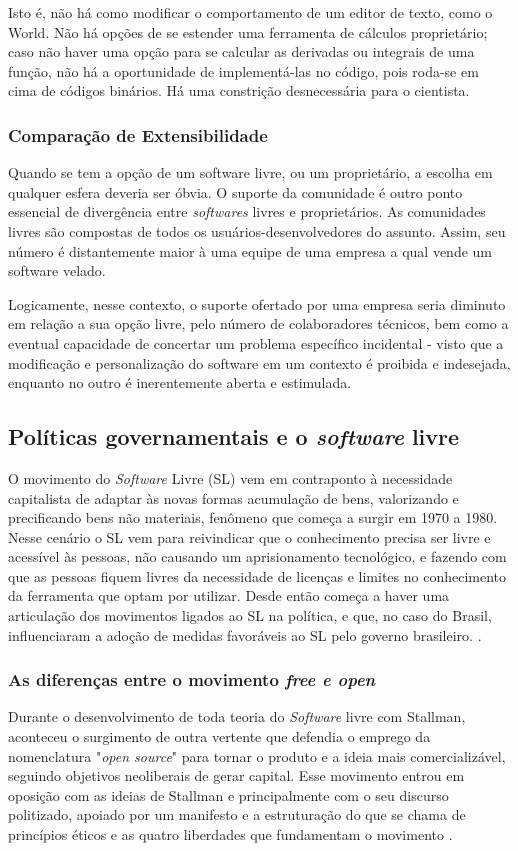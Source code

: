 \documentclass[12pt]{article}
\begin{document}
Isto é, não há como modificar o comportamento
de um editor de texto, como o World. Não há opções de se estender uma
ferramenta de cálculos proprietário; caso não haver uma opção para se
calcular as derivadas ou integrais de uma função, não há a
oportunidade de implementá-las no código, pois roda-se em cima de
códigos binários. Há uma constrição desnecessária para o cientista.

\subsubsection{Comparação de Extensibilidade}

Quando se tem a opção de um software livre, ou um proprietário, a escolha em qualquer esfera deveria ser óbvia. O suporte da comunidade é outro
ponto essencial de divergência entre \textit{softwares} livres e proprietários. As comunidades livres são compostas de todos os
usuários-desenvolvedores do assunto. Assim, seu número é distantemente
maior à uma equipe de uma empresa a qual vende um software
velado.

Logicamente, nesse contexto, o suporte ofertado por uma empresa
seria diminuto em relação a sua opção livre, pelo número de
colaboradores técnicos, bem como a eventual capacidade de concertar
um problema específico incidental - visto que a modificação e personalização do software em
um contexto é proibida e indesejada, enquanto no outro é inerentemente aberta e
estimulada.


\subsection{Políticas governamentais e o \textit{software} livre}
O movimento do \textit{Software} Livre (SL) vem em contraponto à necessidade capitalista de adaptar às novas formas acumulação de bens, valorizando e precificando bens não materiais, fenômeno que começa a surgir em 1970 a 1980. Nesse cenário o SL vem para reivindicar que o conhecimento precisa ser livre e acessível às pessoas, não causando um aprisionamento tecnológico, e fazendo com que as pessoas fiquem livres da necessidade de licenças e limites no conhecimento da ferramenta que optam por utilizar. Desde então começa a haver uma articulação dos movimentos ligados ao SL na política, e que, no caso do Brasil, influenciaram a adoção de medidas favoráveis ao SL pelo governo brasileiro. \cite{torres2018software}.
\subsubsection{As diferenças entre o movimento \textit{free e open}}
Durante o desenvolvimento de toda teoria do \textit{Software} livre com Stallman, aconteceu o surgimento de outra vertente que defendia o emprego da nomenclatura "\textit{open source}" para tornar o produto e a ideia mais comercializável, seguindo objetivos neoliberais de gerar capital. Esse movimento entrou em oposição com as ideias de Stallman e principalmente com o seu discurso politizado, apoiado por um manifesto e a estruturação do que se chama de princípios éticos e as quatro liberdades que fundamentam o movimento \cite{evangelista2014movimento}.
\end{document}
